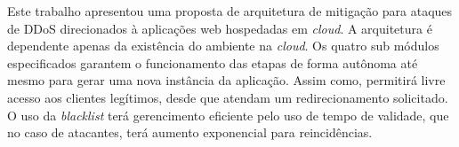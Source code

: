 
Este trabalho apresentou uma proposta de arquitetura de mitigação para ataques de DDoS direcionados à aplicações web hospedadas em \emph{cloud}. A arquitetura é dependente apenas da existência do ambiente na \emph{cloud}. Os quatro sub módulos especificados garantem o funcionamento das etapas de forma autônoma até mesmo para gerar uma nova instância da aplicação. Assim como, permitirá livre acesso aos clientes legítimos, desde que atendam um redirecionamento solicitado. O uso da \emph{blacklist} terá gerencimento eficiente pelo uso de tempo de validade, que no caso de atacantes, terá aumento exponencial para reincidências.

